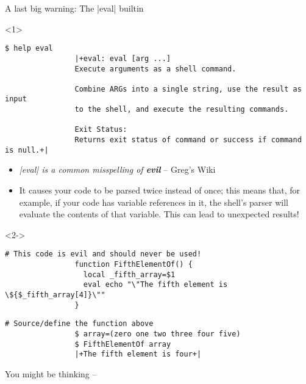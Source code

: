 \begin{frame}[fragile]{A last big warning: The \bash|eval| builtin}
    \vspace{-3mm}
    \begin{overlayarea}{\textwidth}{0.64\textheight}
        \begin{onlyenv}<1>
            \begin{lstlisting}[style=MyBash, numbers=none, xleftmargin=2mm, xrightmargin=2mm]
                $ help eval
                |+eval: eval [arg ...]
                Execute arguments as a shell command.

                Combine ARGs into a single string, use the result as input
                to the shell, and execute the resulting commands.

                Exit Status:
                Returns exit status of command or success if command is null.+|
            \end{lstlisting}
            \begin{itemize}
                \item \emph{\guillemotleft\bash|eval| is a common misspelling of \textbf{evil}\guillemotright} -- Greg's Wiki
                \item It causes your code to be parsed twice instead of once; this means that, for example, if your code has variable references in it, the shell's parser will evaluate the contents of that variable.
                      This can lead to unexpected results!
            \end{itemize}
        \end{onlyenv}
        \begin{onlyenv}<2->
            \begin{lstlisting}[style=MyBash, emph={[7]_fifth_array}]
                # This code is evil and should never be used!
                function FifthElementOf() {
                  local _fifth_array=$1
                  eval echo "\"The fifth element is \${$_fifth_array[4]}\""
                }
            \end{lstlisting}
            \smallskip
            \begin{lstlisting}[style=MyBash, emph={[7]_fifth_array}, belowskip=-5mm]
                # Source/define the function above
                $ array=(zero one two three four five)
                $ FifthElementOf array
                |+The fifth element is four+|
            \end{lstlisting}
            You might be thinking --  

\end{onlyenv}
\end{overlayarea}
\end{frame}
